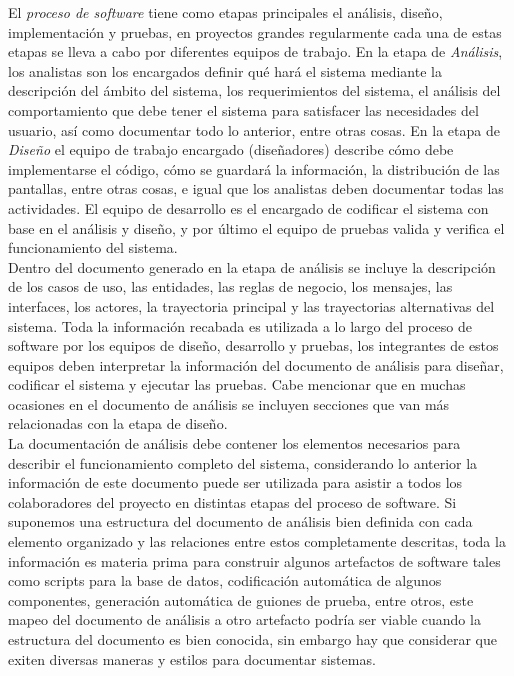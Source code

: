 
El \emph{proceso de software} tiene como etapas principales el análisis, diseño, implementación y pruebas, 
en proyectos grandes regularmente cada una de estas etapas se lleva a cabo por diferentes equipos
de trabajo. En la etapa de \emph{Análisis}, los analistas son los encargados definir qué hará el sistema
mediante la descripción del ámbito del sistema, los requerimientos del sistema, el análisis del comportamiento que debe tener el sistema para satisfacer 
las necesidades del usuario, así como documentar todo lo anterior, entre otras cosas. En la etapa de \emph{Diseño} el equipo de trabajo encargado
(diseñadores) describe cómo debe implementarse el código, cómo se guardará la información, la distribución de las pantallas, entre otras cosas, e igual
que los analistas deben documentar todas las actividades. El equipo de desarrollo es el encargado de codificar el sistema con base en el análisis 
y diseño, y por último el equipo de pruebas valida y verifica el funcionamiento del sistema.\\

Dentro del documento generado en la etapa de análisis se incluye la descripción de los casos de uso, las entidades, 
las reglas de negocio, los mensajes, las interfaces, los actores, la trayectoria principal
y las trayectorias alternativas del sistema. Toda la información recabada es utilizada a lo largo del proceso de software 
por los equipos de diseño, desarrollo y pruebas, los integrantes de estos
equipos deben interpretar la información del documento de análisis para diseñar, codificar el sistema y ejecutar las pruebas. 
Cabe mencionar que en muchas ocasiones en el documento de análisis se incluyen secciones que van más relacionadas con la etapa de diseño.\\

La documentación de análisis debe contener los elementos necesarios para describir el funcionamiento completo del sistema, considerando lo anterior
la información de este documento puede ser utilizada para asistir a todos los colaboradores del proyecto en distintas etapas
del proceso de software. Si suponemos una estructura del documento de análisis
bien definida con cada elemento organizado y las relaciones entre estos completamente descritas, toda la información es materia prima para construir algunos
artefactos de software tales como scripts para la base de datos, codificación automática de algunos componentes, generación automática de guiones de prueba, entre otros,
este mapeo del documento de análisis a otro artefacto podría ser viable cuando la estructura del documento es bien conocida, 
sin embargo hay que considerar que exiten diversas maneras y estilos para 
documentar sistemas.\\

